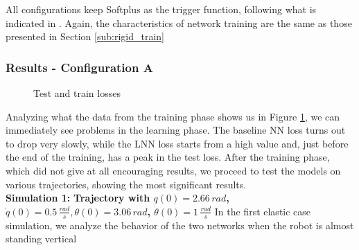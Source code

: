 \documentclass[a4paper]{article}
\begin{document}
All configurations keep Softplus as the trigger function, following what is indicated in \cite{lnncranmer}. Again, the characteristics of network training are the same as those presented in Section \ref{sub:rigid_train}
\subsubsection{Results - Configuration A}
\begin{figure}
    \centering
    \qquad
    \caption{Test and train losses}
    \label{fig:elastic_losses_300_2}
\end{figure}

Analyzing what the data from the training phase shows us in Figure \ref{fig:elastic_losses_300_2}, we can immediately see problems in the learning phase. The baseline NN loss turns out to drop very slowly, while the LNN loss starts from a high value and, just before the end of the training, has a peak in the test loss. After the training phase, which did not give at all encouraging results, we proceed to test the models on various trajectories, showing the most significant results.\\

\textbf{Simulation 1:} \textbf{Trajectory with $q(0)=2.66\, rad$, $\dot{q}(0)=0.5\, \frac{rad}{s}, \theta(0)=3.06\, rad$, $\dot{\theta}(0)=1\, \frac{rad}{s}$}
In the first elastic case simulation, we analyze the behavior of the two networks when the robot is almost standing vertical
\end{document}
